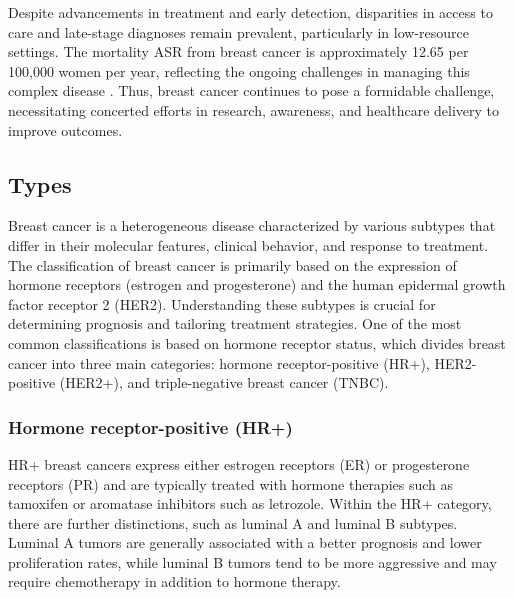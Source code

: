 Despite advancements in treatment and early detection, disparities in access to
care and late-stage diagnoses remain prevalent, particularly in low-resource
settings\supercite{wilkinson_understanding_2022,ginsburg_breast_2020}.
The mortality ASR from breast cancer is approximately 12.65 per 100,000 women
per year, reflecting the ongoing challenges in managing this complex disease
\supercite{bray_global_2024,ferlay_global_2024}.
Thus, breast cancer continues to pose a formidable challenge, necessitating
concerted efforts in research, awareness, and healthcare delivery to improve
outcomes\supercite{desantis_breast_2019}.

\pagebreak

\subsection{Types}
\label{sec:brca_types}

Breast cancer is a heterogeneous disease characterized by various subtypes that
differ in their molecular features, clinical behavior, and response to
treatment\supercite{harbeck_breast_2019}.
The classification of breast cancer is primarily based on the expression of
hormone receptors (estrogen and progesterone) and the human epidermal growth
factor receptor 2 (HER2).
Understanding these subtypes is crucial for determining prognosis and tailoring
treatment strategies.
One of the most common classifications is based on hormone receptor status,
which divides breast cancer into three main categories: hormone
receptor-positive (HR+), HER2-positive (HER2+), and triple-negative breast
cancer (TNBC)\supercite{clusan_basic_2023}.

\subsubsection{Hormone receptor-positive (HR+)}
HR+ breast cancers express either estrogen receptors (ER) or progesterone
receptors (PR) and are typically treated with hormone therapies such as
tamoxifen or aromatase inhibitors such as
letrozole\supercite{geyer_molecular_2012}.
Within the HR+ category, there are further distinctions, such as luminal A and
luminal B subtypes.
Luminal A tumors are generally associated with a better prognosis and lower
proliferation rates, while luminal B tumors tend to be more aggressive and may
require chemotherapy in addition to hormone
therapy\supercite{geyer_molecular_2012}.

